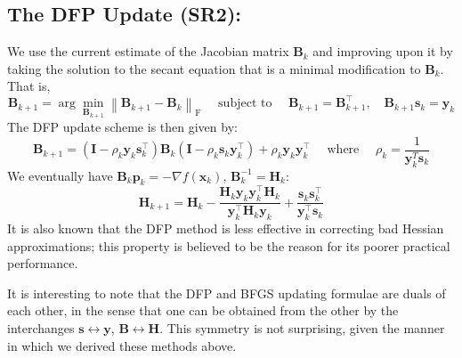 \documentclass[11pt]{article}
\theoremstyle{plain} %
\newenvironment{topic}
{\color{C2}\normalfont\begin{framed}\begingroup }
  {\endgroup\end{framed}}
\theoremstyle{remark}
\begin{document}
\subsection{The DFP Update (SR2):}
\begin{topic}
  We use the current estimate of the Jacobian matrix
  $\mathbf{B}_{k}$ and improving upon it by taking the solution to the secant
  equation that is a minimal modification to $\mathbf{B}_{k}$. That is,
  $$
    \mathbf{B}_{k+1} = \arg\min_{\mathbf{B}_{k+1}} \left\|\mathbf{B}_{k+1}-\mathbf{B}_{k}\right\|_{\mathrm{F}}
    \quad \text{ subject to }\quad  \mathbf{B}_{k+1} = \mathbf{B}_{k+1}^\top,\quad
    \mathbf{B}_{k+1}\mathbf{s}_k =\mathbf{y}_k
  $$
  The DFP update scheme is then given by:
  $$
    \mathbf{B}_{k+1}=\left(\mathbf{I}-\rho_k \mathbf{y}_k \mathbf{s}_k^\top\right) \mathbf{B}_k\left(\mathbf{I}-\rho_k \mathbf{s}_k \mathbf{y}_k^\top\right)+\rho_k \mathbf{y}_k \mathbf{y}_k^\top
    \quad \text{ where } \quad
    \rho_k=\frac{1}{\mathbf{y}_k^T \mathbf{s}_k}
  $$
  We eventually have $\mathbf{B}_k \mathbf{p}_k = -\nabla f\left(\mathbf{x}_k\right)$, $\mathbf{B}_{k}^{-1} = \mathbf{H}_k$:
  $$
    \mathbf{H}_{k+1}=\mathbf{H}_k-\frac{\mathbf{H}_k \mathbf{y}_k \mathbf{y}_k^\top \mathbf{H}_k}{\mathbf{y}_k^	\top \mathbf{H}_k \mathbf{y}_k}+\frac{\mathbf{s}_k \mathbf{s}_k^\top}{\mathbf{y}_k^\top \mathbf{s}_k}
  $$
  It is also known that the DFP method is less effective in correcting bad
  Hessian approximations; this property is believed to be the reason for its
  poorer practical performance.

  It is interesting to note that the DFP and BFGS updating formulae are duals of
  each other, in the sense that one can be obtained from the other by the
  interchanges $\mathbf{s} \longleftrightarrow \mathbf{y}$, $\mathbf{B} \longleftrightarrow \mathbf{H}$. This symmetry is not surprising, given the manner
  in which we derived these methods above.

\end{topic}
\end{document}
